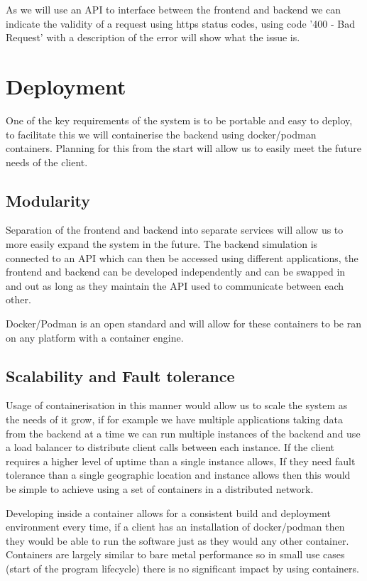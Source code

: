 \documentclass{article}
\begin{document}
As we will use an API to interface between the frontend and backend we can indicate 
the validity of a request using https status codes, using code '400 - Bad Request' 
with a description of the error will show what the issue is.

\section{Deployment}
One of the key requirements of the system is to be portable and easy to deploy, 
to facilitate this we will containerise the backend using docker/podman containers. 
Planning for this from the start will allow us to easily meet the future needs of the 
client. 

\subsection{Modularity}
Separation of the frontend and backend into separate services will allow us to more 
easily expand the system in the future. The backend simulation is connected to an API 
which can then be accessed using different applications, the frontend and backend can 
be developed independently and can be swapped in and out as long as they maintain the 
API used to communicate between each other.

Docker/Podman is an open standard and will allow for these containers to be ran 
on any platform with a container engine.

\subsection{Scalability and Fault tolerance}
Usage of containerisation in this manner would allow us to scale the system as the 
needs of it grow, if for example we have multiple applications taking data from the 
backend at a time we can run multiple instances of the backend and use a load balancer 
to distribute client calls between each instance. If the client requires a higher level 
of uptime than a single instance allows, If they need fault tolerance than a single 
geographic location and instance allows then this would be simple to achieve using a 
set of containers in a distributed network.

Developing inside a container allows for a consistent build and deployment environment 
every time, if a client has an installation of docker/podman then they would be able to 
run the software just as they would any other container. Containers are largely similar 
to bare metal performance so in small use cases (start of the program lifecycle) there 
is no significant impact by using containers.
\end{document}
